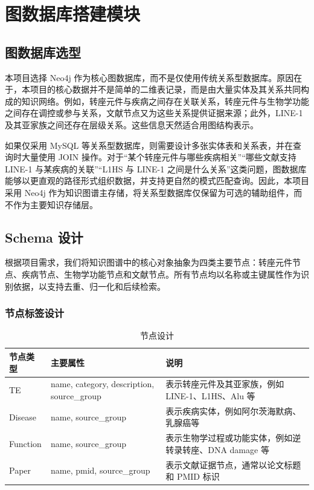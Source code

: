 ﻿\section{图数据库搭建模块}

\subsection{图数据库选型}

本项目选择 Neo4j 作为核心图数据库，而不是仅使用传统关系型数据库。原因在于，本项目的核心数据并不是简单的二维表记录，而是由大量实体及其关系共同构成的知识网络。例如，转座元件与疾病之间存在关联关系，转座元件与生物学功能之间存在调控或参与关系，文献节点又为这些关系提供证据来源；此外，LINE-1 及其亚家族之间还存在层级关系。这些信息天然适合用图结构表示。

如果仅采用 MySQL 等关系型数据库，则需要设计多张实体表和关系表，并在查询时大量使用 JOIN 操作。对于“某个转座元件与哪些疾病相关”“哪些文献支持 LINE-1 与某疾病的关联”“L1HS 与 LINE-1 之间是什么关系”这类问题，图数据库能够以更直观的路径形式组织数据，并支持更自然的模式匹配查询。因此，本项目采用 Neo4j 作为知识图谱主存储，将关系型数据库仅保留为可选的辅助组件，而不作为主要知识存储层。

\subsection{Schema 设计}

根据项目需求，我们将知识图谱中的核心对象抽象为四类主要节点：转座元件节点、疾病节点、生物学功能节点和文献节点。所有节点均以名称或主键属性作为识别依据，以支持去重、归一化和后续检索。

\subsubsection*{节点标签设计}

\begin{table}[H]
  \centering
  \caption{节点设计}
  \begin{tabular}{p{2.5cm} p{5cm} p{6cm}}
    \toprule
    节点类型 & 主要属性 & 说明 \\
    \midrule
    TE & name, category, description, source\_group & 表示转座元件及其亚家族，例如 LINE-1、L1HS、Alu 等 \\
    Disease & name, source\_group & 表示疾病实体，例如阿尔茨海默病、乳腺癌等 \\
    Function & name, source\_group & 表示生物学过程或功能实体，例如逆转录转座、DNA damage 等 \\
    Paper & name, pmid, source\_group & 表示文献证据节点，通常以论文标题和 PMID 标识 \\
    \bottomrule
  \end{tabular}
\end{table}

